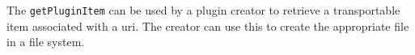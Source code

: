 The \verb+getPluginItem+ can be used by a plugin creator to retrieve a transportable item associated with
a \Rapture uri. The creator can use this to create the appropriate file in a file system.
